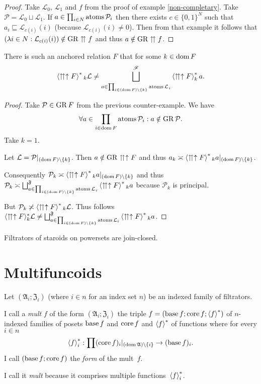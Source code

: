 \begin{proof}
Take $\mathcal{L}_{0}$, $\mathcal{L}_{1}$ and $f$ from the proof
of example \ref{non-completary}. Take $\mathcal{P}=\mathcal{L}_{0}\sqcup\mathcal{L}_{1}$.
If $a\in\prod_{i\in N}\operatorname{atoms}\mathcal{P}_{i}$ then there exists $c\in\{0,1\}^{N}$
such that $a_{i}\sqsubseteq\mathcal{L}_{c(i)}(i)$ (because $\mathcal{L}_{c(i)}(i)\neq0$).
Then from that example it follows that $(\lambda i\in N:\mathcal{L}_{c(i)}(i))\notin\operatorname{GR}\upuparrows f$
and thus $a\notin\operatorname{GR}\upuparrows f$.\end{proof}
\begin{example}
There is such an anchored relation $F$ that for some $k\in\operatorname{dom} F$
\[
\left\langle \upuparrows\uparrow F\right\rangle ^{\ast}{}_{k}\mathcal{L}\neq\bigsqcup_{a\in\prod_{i\in(\operatorname{dom} F)\setminus\{k\}}\operatorname{atoms}\mathcal{L_{}}_{i}}^{\mathscr{F}}\left\langle \upuparrows\uparrow F\right\rangle ^{\ast}_{k}a.
\]
\end{example}
\begin{proof}
Take $\mathcal{P}\in\operatorname{GR} F$ from the previous counter-example. We
have 
\[
\forall a\in\prod_{i\in\operatorname{dom} F}\operatorname{atoms}\mathcal{P}_{i}:a\notin\operatorname{GR}\mathcal{P}.
\]
Take $k=1$.

Let $\mathcal{L}=\mathcal{P}|_{(\operatorname{dom} F)\setminus\{k\}}$. Then $a\notin\operatorname{GR}\upuparrows\uparrow F$
and thus $a_{k}\asymp\left\langle \upuparrows\uparrow F\right\rangle ^{\ast}{}_{k}a|_{(\operatorname{dom} F)\setminus\{k\}}$.

Consequently $\mathcal{P}_{k}\asymp\left\langle \upuparrows\uparrow F\right\rangle ^{\ast}{}_{k}a|_{(\operatorname{dom} F)\setminus\{k\}}$
and thus $\mathcal{P}_{k}\asymp\bigsqcup_{a\in\prod_{i\in(\operatorname{dom} F)\setminus\{k\}}\operatorname{atoms}\mathcal{L_{}}_{i}}^{\mathfrak{F}}\left\langle \upuparrows\uparrow F\right\rangle ^{\ast}{}_{k}a$
because $\mathcal{P}_{k}$ is principal.

But $\mathcal{P}_{k}\not\asymp\left\langle \upuparrows\uparrow F\right\rangle ^{\ast}{}_{k}\mathcal{L}$.
Thus follows $\langle\upuparrows\uparrow F\rangle_{k}^{\ast}\mathcal{L}\neq\bigsqcup_{a\in\prod_{i\in(\operatorname{dom} F)\setminus\{k\}}\operatorname{atoms}\mathcal{L}_{i}}^{\mathfrak{F}}\left\langle \upuparrows\uparrow F\right\rangle ^{\ast}{}_{k}a$.\end{proof}
\begin{conjecture}
Filtrators of staroids on powersets are join-closed.
\end{conjecture}

\section{Multifuncoids}
\begin{defn}
Let $(\mathfrak{A}_{i};\mathfrak{Z}_{i})$ (where $i\in n$
for an index set $n$) be an indexed family of filtrators.

I call a \emph{mult} $f$ of the form $(\mathfrak{A}_{i};\mathfrak{Z}_{i})$
the triple $f=(\operatorname{base} f;\operatorname{core} f;\left\langle f\right\rangle ^{\ast})$ of $n$-indexed families
of posets $\operatorname{base} f$ and $\operatorname{core} f$ and $\left\langle f\right\rangle ^{\ast}$ of functions
where for every $i\in n$ 
\[
\left\langle f\right\rangle ^{\ast}_{i}:\prod(\operatorname{core} f)_{i}|_{(\operatorname{dom}\mathfrak{A})\setminus\{i\}}\rightarrow(\operatorname{base} f)_{i}.
\]
I call $(\operatorname{base} f;\operatorname{core} f)$ the \emph{form} of the mult~$f$.\end{defn}
\begin{rem}
I call it \emph{mult} because it comprises multiple functions~$\left\langle f\right\rangle ^{\ast}_{i}$.
\end{rem}

